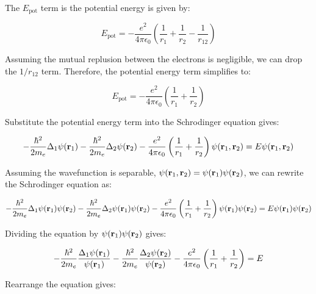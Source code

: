 \documentclass[11pt]{article}
\begin{document}
    The $E_{\text{pot}}$ term is the potential energy is given by:

    \begin{equation}
      E_{\text{pot}} = - \frac{e^{2}}{4\pi\epsilon_0} \left( \frac{1}{r_1} + \frac{1}{r_2} - \frac{1}{r_{12}}\right)
    \end{equation}

    Assuming the mutual replusion between the electrons is negligible, we can drop the $1/r_{12}$ term. 
    Therefore, the potential energy term simplifies to:

    \begin{equation}
      E_{\text{pot}} = - \frac{e^{2}}{4\pi\epsilon_0} \left( \frac{1}{r_1} + \frac{1}{r_2}\right)
    \end{equation}

    Substitute the potential energy term into the Schrodinger equation gives:

    \begin{equation}
      - \frac{\hbar^{2}}{2m_e}\Delta_1 \psi(\vb{r}_{1}) 
      - \frac{\hbar^{2}}{2m_e}\Delta_2 \psi(\vb{r}_{2})
      - \frac{e^{2}}{4\pi\epsilon_0} \left( \frac{1}{r_1} + \frac{1}{r_2}\right)\psi(\vb{r}_{1}, \vb{r}_{2}) 
      = E\psi(\vb{r}_{1}, \vb{r}_{2})
    \end{equation}

    Assuming the wavefunction is separable, $\psi(\vb{r}_{1}, \vb{r}_{2}) = \psi(\vb{r}_{1})\psi(\vb{r}_{2})$, 
    we can rewrite the Schrodinger equation as:

    \begin{equation}
      - \frac{\hbar^{2}}{2m_e}\Delta_1 \psi(\vb{r}_{1})\psi(\vb{r}_{2})  
      - \frac{\hbar^{2}}{2m_e}\Delta_2 \psi(\vb{r}_{1})\psi(\vb{r}_{2}) 
      - \frac{e^{2}}{4\pi\epsilon_0} \left( \frac{1}{r_1} + \frac{1}{r_2}\right)\psi(\vb{r}_{1})\psi(\vb{r}_{2}) 
      = E\psi(\vb{r}_{1})\psi(\vb{r}_{2}) 
    \end{equation}

    Dividing the equation by $\psi(\vb{r}_{1})\psi(\vb{r}_{2})$ gives:

    \begin{equation}
      - \frac{\hbar^{2}}{2m_e}\frac{\Delta_1 \psi(\vb{r}_{1})}{\psi(\vb{r}_{1})}  
      - \frac{\hbar^{2}}{2m_e}\frac{\Delta_2 \psi(\vb{r}_{2})}{\psi(\vb{r}_{2})} 
      - \frac{e^{2}}{4\pi\epsilon_0} \left( \frac{1}{r_1} + \frac{1}{r_2}\right) 
      = E
    \end{equation}

    Rearrange the equation gives:
\end{document}
